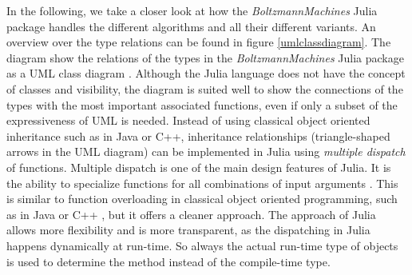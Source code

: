 \documentclass[12pt]{article}
\newcommand{\apkg}[1]{\emph{#1}}
\begin{document}
In the following, we take a closer look at how the \apkg{BoltzmannMachines} Julia package handles the different algorithms and all their different variants.
An overview over the type relations can be found in figure \ref{umlclassdiagram}.
The diagram show the relations of the types in the \apkg{BoltzmannMachines} Julia package as a UML class diagram \citep{uml}.
Although the Julia language does not have the concept of classes and visibility, the diagram is suited well to show the connections of the types with the most important associated functions, even if only a subset of the expressiveness of UML is needed.
Instead of using classical object oriented inheritance such as in Java or C++, inheritance relationships (triangle-shaped arrows in the UML diagram) can be implemented in Julia using {\em multiple dispatch} of functions.
Multiple dispatch is one of the main design features of Julia.
It is the ability to specialize functions for all combinations of input arguments \citep{zappa_nardelli_julia_2018}.
This is similar to function overloading in classical object oriented programming, such as in Java \citep{arnold2005java} or C++ \citep{cppstandard}, but it offers a cleaner approach.
The approach of Julia allows more flexibility and is more transparent, as the dispatching in Julia happens dynamically at run-time.
So always the actual run-time type of objects is used to determine the method instead of the compile-time type.
\end{document}

